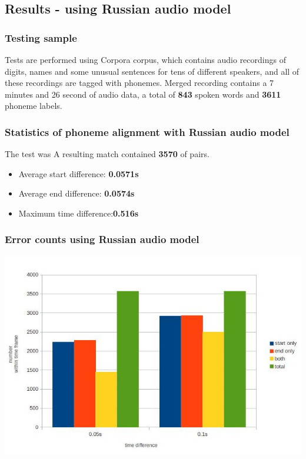 \documentclass[]{beamer}
\begin{document}
\subsection{Results - using Russian audio model}
\begin{frame}
    \frametitle{Testing sample}
    Tests are performed using Corpora corpus, which contains audio recordings of digits, names and some unusual sentences for tens of different speakers, and all of these recordings are tagged with phonemes. \newline
    Merged recording contains a 7 minutes and 26 second of audio data, a total of \textbf{843} spoken words and \textbf{3611} phoneme labels. \newline 
\end{frame}
\begin{frame}
    \frametitle{Statistics of phoneme alignment with Russian audio model}
    The test was 
    A resulting match contained \textbf{3570} of pairs.
    \begin{itemize}
        \item Average start difference: \textbf{ 0.0571s}
        \item Average end difference: \textbf{0.0574s}
        \item Maximum time difference:\textbf{0.516s}
    \end{itemize}
\end{frame}
\begin{frame}
    \frametitle{Error counts using Russian audio model}
    \includegraphics[scale=0.37]{corpora_phoneme_russian_counts.jpg}
\end{frame}
\end{document}
